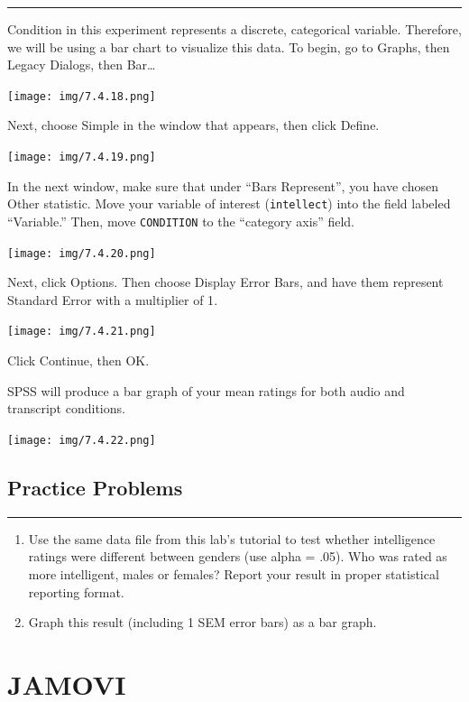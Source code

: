\documentclass[]{book}
\begin{document}
\begin{center}\rule{0.5\linewidth}{0.5pt}\end{center}

Condition in this experiment represents a discrete, categorical
variable. Therefore, we will be using a bar chart to visualize this
data. To begin, go to {Graphs}, then {Legacy Dialogs}, then
{Bar\ldots{}}

\texttt{[image: img/7.4.18.png]}

Next, choose {Simple} in the window that appears, then click {Define}.

\texttt{[image: img/7.4.19.png]}

In the next window, make sure that under ``Bars Represent'', you have
chosen {Other statistic}. Move your variable of interest
(\texttt{intellect}) into the field labeled ``Variable.'' Then, move
\texttt{CONDITION} to the ``category axis'' field.

\texttt{[image: img/7.4.20.png]}

Next, click {Options}. Then choose {Display Error Bars}, and have them
represent {Standard Error} with a {multiplier of 1}.

\texttt{[image: img/7.4.21.png]}

Click {Continue}, then {OK}.

SPSS will produce a bar graph of your mean ratings for both audio and
transcript conditions.

\texttt{[image: img/7.4.22.png]}

\subsection{Practice Problems}\label{practice-problems-6}

\begin{center}\rule{0.5\linewidth}{0.5pt}\end{center}

\begin{enumerate}
\def\labelenumi{\arabic{enumi}.}
\item
  Use the same data file from this lab's tutorial to test whether
  intelligence ratings were different between genders (use alpha = .05).
  Who was rated as more intelligent, males or females? Report your
  result in proper statistical reporting format.
\item
  Graph this result (including 1 SEM error bars) as a bar graph.
\end{enumerate}

\section{JAMOVI}\label{jamovi-7}
\end{document}
